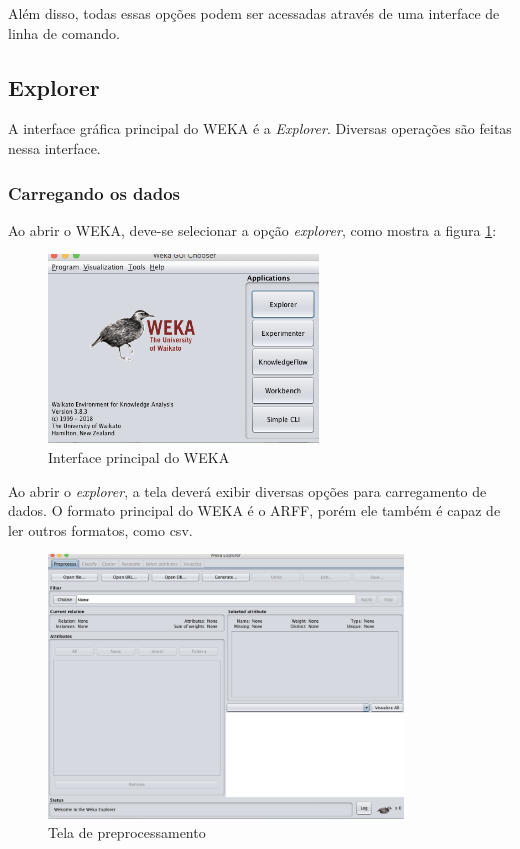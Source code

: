 Além disso, todas essas opções podem ser acessadas através de uma interface de linha de comando.

\subsection{Explorer}
A interface gráfica principal do WEKA é a \textit{Explorer}. Diversas operações são feitas nessa interface.

\subsubsection{Carregando os dados}
Ao abrir o WEKA, deve-se selecionar a opção \textit{explorer}, como mostra a figura \ref{explorer}:

\begin{figure}[H]
\centering
\includegraphics[height=5cm]{imagens/wekaprincipal.png}
\caption{Interface principal do WEKA}
\label{explorer}
\end{figure}

Ao abrir o \textit{explorer}, a tela deverá exibir diversas opções para carregamento de dados. O formato principal do WEKA é o ARFF, porém ele também é capaz de ler outros formatos, como csv.

\begin{figure}[H]
\centering
\includegraphics[height=7cm]{imagens/wekapreprocessempty.png}
\caption{Tela de preprocessamento}
\label{figura19}
\end{figure}

